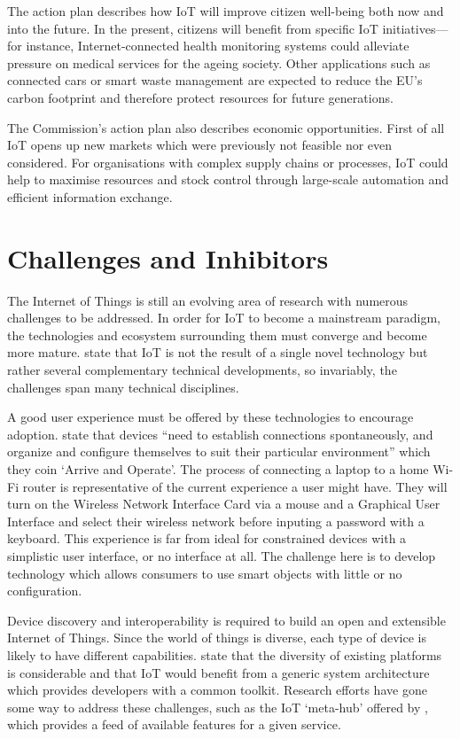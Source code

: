     The action plan \citep{ECIoT:2009} describes how IoT will improve citizen well-being both now and into the future. In the present, citizens will benefit from specific IoT initiatives---for instance, Internet-connected health monitoring systems could alleviate pressure on medical services for the ageing society. Other applications such as connected cars or smart waste management are expected to reduce the EU's carbon footprint and therefore protect resources for future generations.

    The Commission's action plan also describes economic opportunities. First of all IoT opens up new markets which were previously not feasible nor even considered. For organisations with complex supply chains or processes, IoT could help to maximise resources and stock control through large-scale automation and efficient information exchange.

  \section{Challenges and Inhibitors}
  \label{challenges}
    The Internet of Things is still an evolving area of research with numerous challenges to be addressed. In order for IoT to become a mainstream paradigm, the technologies and ecosystem surrounding them must converge and become more mature. \citet{fromIoC} state that IoT is not the result of a single novel technology but rather several complementary technical developments, so invariably, the challenges span many technical disciplines. 

    A good user experience must be offered by these technologies to encourage adoption. \citet{fromIoC} state that devices ``need to establish connections spontaneously, and organize and configure themselves to suit their particular environment'' which they coin `Arrive and Operate'. The process of connecting a laptop to a home Wi-Fi router is representative of the current experience a user might have. They will turn on the Wireless Network Interface Card via a mouse and a Graphical User Interface and select their wireless network before inputing a password with a keyboard. This experience is far from ideal for constrained devices with a simplistic user interface, or no interface at all. The challenge here is to develop technology which allows consumers to use smart objects with little or no configuration.

    Device discovery and interoperability is required to build an open and extensible Internet of Things. Since the world of things is diverse, each type of device is likely to have different capabilities. \citet{interoperability:2015} state that the diversity of existing platforms is considerable and that IoT would benefit from a generic system architecture which provides developers with a common toolkit. Research efforts have gone some way to address these challenges, such as the IoT `meta-hub' offered by \citeauthor{interoperability:2015}, which provides a feed of available features for a given service.

